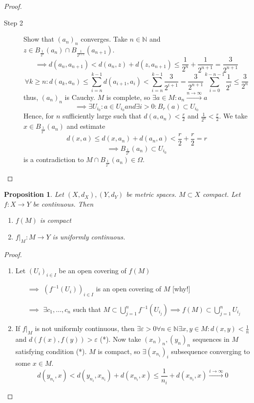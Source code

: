 \documentclass[a4paper]{article}
\newcounter{lecref}[section]
\numberwithin{lecref}{section}
\newtheorem{proposition}[lecref]{Proposition}
\begin{document}
\begin{proof}
\begin{description}
\begin{description}
				\item[Step 2] Show that $(a_n)_n$ converges. Take $n \in \mathbb N$ and $z \in B_{\frac{1}{2^n}}(a_n) \cap B_{\frac{1}{2^{n+1}}}(a_{n+1})$.
					\[ \implies d(a_n, a_{n+1}) < d(a_n, z) + d(z, a_{n+1}) \leq \frac{1}{2^n} + \frac{1}{2^{n+1}} = \frac{3}{2^{n+1}} \]
					\[ \forall k \geq n: d(a_k, a_n) \leq \sum_{i=n}^{k-1} d(a_{i+1}, a_i) < \sum_{i=n}^{k-1} \frac{3}{2^{i+1}} = \frac{3}{2^{n+1}} \sum_{i=0}^{k-n-1} \frac{1}{2^i} \leq \frac{3}{2^n} \]
					thus, $(a_n)_n$ is Cauchy. $M$ is complete, so $\exists a \in M: a_n \xrightarrow{n \to \infty} a$
					\[ \implies \exists U_{i_0}: a \in U_{i_0} and \exists i > 0: B_r(a) \subset U_{i_0} \]
					Hence, for $n$ sufficiently large such that $d(a, a_n) < \frac r2$ and $\frac1{2^n} < \frac r2$.
					We take $x \in B_{\frac1{2^n}}(a_n)$ and estimate
					\[ d(x, a) \leq d(x, a_n) + d(a_n, a) < \frac r2 + \frac r2 = r \]
					\[ \implies B_{\frac{1}{2^n}}(a_n) \subset U_{i_0} \]
					is a contradiction to $M \cap B_{\frac1{2^n}}(a_n) \in \Omega$.
			\end{description}
	\end{description}
\end{proof}

\begin{proposition}
	\label{proposition:1.20}
	Let $(X, d_X), (Y, d_Y)$ be metric spaces. $M \subset X$ compact. Let $f: X \to Y$ be continuous. Then
	\begin{enumerate}
		\item $f(M)$ is compact
		\item $f|_M: M \to Y$ is uniformly continuous.
	\end{enumerate}
\end{proposition}

\begin{proof}
	\begin{enumerate}
		\item Let $(U_i)_{i \in I}$ be an open covering of $f(M)$
			\begin{enumerate}
				\item[$\implies$] $(f^{-1}(U_i))_{i \in I}$ is an open covering of $M$ [why!]
				\item[$\implies$] $\exists c_1, \dots, c_n$ such that $M \subset \bigcup_{j=1}^n f^{-1}(U_{i_j}) \implies f(M) \subset \bigcup_{j=1}^n U_{i_j}$
			\end{enumerate}
		\item If $f|_M$ is not uniformly continuous, then $\exists \varepsilon > 0 \forall n \in \mathbb N \exists x, y \in M: d(x, y) < \frac1n$ and $d(f(x), f(y)) > \varepsilon$ (*).
			Now take $(x_n)_n, (y_n)_n$ sequences in $M$ satisfying condition (*).
			$M$ is compact, so $\exists (x_{n_i})_{i}$ subsequence converging to some $x \in M$.
			\[ d(y_{n_i}, x) < d(y_{n_i}, x_{n_i}) + d(x_{n_i}, x) \leq \frac{1}{n_i} + d(x_{n_i}, x) \xrightarrow{i \to \infty} 0 \]
	\end{enumerate}
\end{proof}
\end{document}
